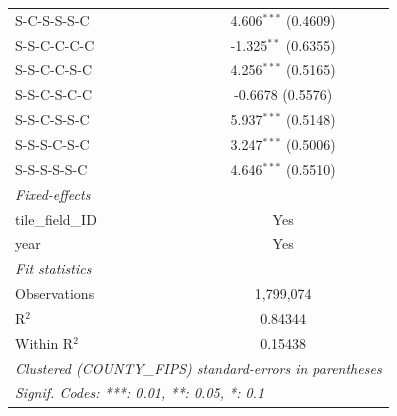 \begin{table}[htbp]
\begin{tabular}{lc}
      S-C-S-S-S-C         & 4.606$^{***}$ (0.4609)\\   
      S-S-C-C-C-C         & -1.325$^{**}$ (0.6355)\\   
      S-S-C-C-S-C         & 4.256$^{***}$ (0.5165)\\   
      S-S-C-S-C-C         & -0.6678 (0.5576)\\   
      S-S-C-S-S-C         & 5.937$^{***}$ (0.5148)\\   
      S-S-S-C-S-C         & 3.247$^{***}$ (0.5006)\\   
      S-S-S-S-S-C         & 4.646$^{***}$ (0.5510)\\   
      \midrule
      \emph{Fixed-effects}\\
      tile\_field\_ID     & Yes\\  
      year                & Yes\\  
      \midrule
      \emph{Fit statistics}\\
      Observations        & 1,799,074\\  
      R$^2$               & 0.84344\\  
      Within R$^2$        & 0.15438\\  
      \midrule \midrule
      \multicolumn{2}{l}{\emph{Clustered (COUNTY\_FIPS) standard-errors in parentheses}}\\
      \multicolumn{2}{l}{\emph{Signif. Codes: ***: 0.01, **: 0.05, *: 0.1}}\\
   \end{tabular}
\end{table}


